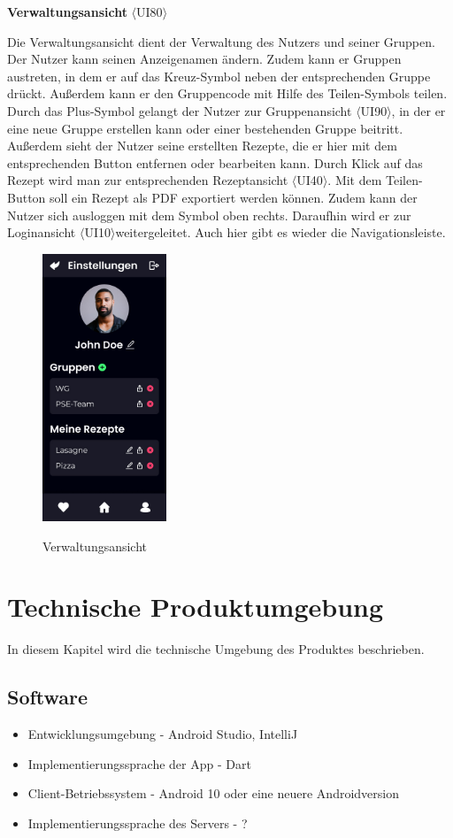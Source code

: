 \documentclass[parskip=full]{scrartcl}
\begin{document}
\textbf{Verwaltungsansicht} $\langle$UI80$\rangle$

Die Verwaltungsansicht dient der Verwaltung des Nutzers und seiner Gruppen. Der Nutzer kann seinen Anzeigenamen ändern. Zudem kann er Gruppen austreten, in dem er auf das Kreuz-Symbol neben der entsprechenden Gruppe drückt. Außerdem kann er den Gruppencode mit Hilfe des Teilen-Symbols teilen. Durch das Plus-Symbol gelangt der Nutzer zur Gruppenansicht $\langle$UI90$\rangle$, in der er eine neue Gruppe erstellen kann oder einer bestehenden Gruppe beitritt. Außerdem sieht der Nutzer seine erstellten Rezepte, die er hier mit dem entsprechenden Button entfernen oder bearbeiten kann. Durch Klick auf das Rezept wird man zur entsprechenden Rezeptansicht $\langle$UI40$\rangle$. Mit dem Teilen-Button soll ein Rezept als PDF exportiert werden können.
Zudem kann der Nutzer sich ausloggen mit dem Symbol oben rechts. Daraufhin wird er zur Loginansicht $\langle$UI10$\rangle$weitergeleitet. Auch hier gibt es wieder die Navigationsleiste.

\begin{figure}[!htp]
    \centering
    \includegraphics[height=80mm]{images/section7/SettingsView.jpg}
    \label{fig:A79}
    \caption{Verwaltungsansicht}
\end{figure}
\newpage
\section{Technische Produktumgebung}
In diesem Kapitel wird die technische Umgebung des Produktes beschrieben.

\subsection{Software}
\begin{itemize}
    \item Entwicklungsumgebung - Android Studio, IntelliJ
    \item Implementierungssprache der App - Dart
    \item Client-Betriebssystem - Android 10 oder eine neuere Androidversion
    \item Implementierungssprache des Servers - ?
\end{itemize}
\end{document}
